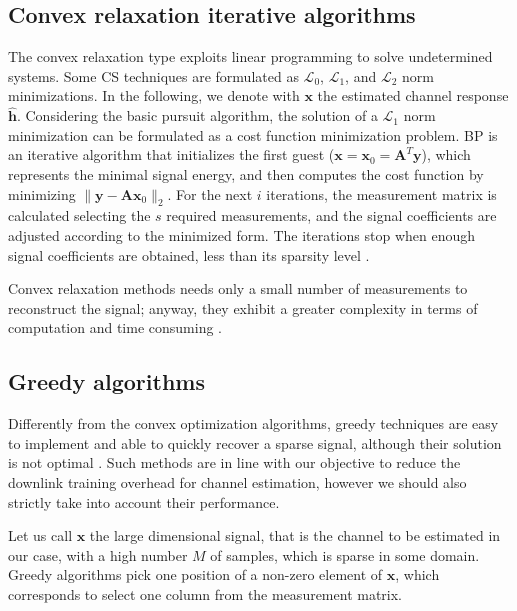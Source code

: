 \subsection{Convex relaxation iterative algorithms} 
The convex relaxation type exploits linear programming to solve undetermined systems.
Some CS techniques are formulated as $\mathcal{L}_0$, $\mathcal{L}_1$, and $\mathcal{L}_2$ norm minimizations. 
In the following, we denote with $\mathbf{x}$ the estimated channel response $\hat{\mathbf{h}}$.
Considering the basic pursuit algorithm, the solution of a $\mathcal{L}_1$ norm minimization can be formulated as a cost function minimization problem. 
BP is an iterative algorithm that initializes the first guest ($\mathbf{x}=\mathbf{x}_0=\mathbf{A}^T\mathbf{y}$), which represents the minimal signal energy, and then computes the cost function by minimizing $\|\mathbf{y}-\mathbf{A} \mathbf{x}_0\|_2$. 
For the next $i$ iterations, the measurement matrix is calculated selecting the $s$ required measurements, and the signal coefficients are adjusted according to the minimized form. The iterations stop when enough signal coefficients are obtained, less than its sparsity level \cite{Phy16}. 

Convex relaxation methods needs only a small number of measurements to reconstruct the signal; anyway, they exhibit a greater complexity in terms of computation and time consuming \cite{Phy16}.

\subsection{Greedy algorithms} 

Differently from the convex optimization algorithms, greedy techniques are easy to implement and able to quickly recover a sparse signal, although their solution is not optimal \cite{Phy16}. Such methods are in line with our objective to reduce the downlink training overhead for channel estimation, however we should also strictly take into account their performance.

Let us call $\mathbf{x}$ the large dimensional signal, that is the channel to be estimated in our case, with a high number $M$ of samples, which is sparse in some domain. 
Greedy algorithms pick one position of a non-zero element of $\mathbf{x}$, which corresponds to select one column from the measurement matrix. 

